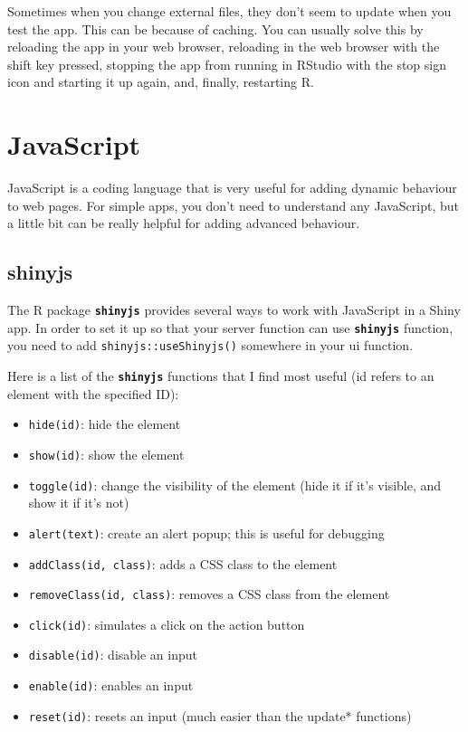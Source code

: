 \documentclass[
  oneside]{book}
\newcommand{\AttributeTok}[1]{\textcolor[rgb]{0.77,0.63,0.00}{#1}}
\providecommand{\tightlist}{%
  \setlength{\itemsep}{0pt}\setlength{\parskip}{0pt}}
\begin{document}
\begin{warning}
Sometimes when you change external files, they don't seem to update when you test the app. This can be because of caching. You can usually solve this by reloading the app in your web browser, reloading in the web browser with the shift key pressed, stopping the app from running in RStudio with the stop sign icon and starting it up again, and, finally, restarting R.

\end{warning}

\hypertarget{JavaScript}{%
\section{JavaScript}\label{JavaScript}}

JavaScript is a coding language that is very useful for adding dynamic behaviour to web pages. For simple apps, you don't need to understand any JavaScript, but a little bit can be really helpful for adding advanced behaviour.

\hypertarget{shinyjs}{%
\subsection{shinyjs}\label{shinyjs}}

The R package \textbf{\texttt{shinyjs}} provides several ways to work with JavaScript in a Shiny app. In order to set it up so that your server function can use \textbf{\texttt{shinyjs}} function, you need to add \texttt{shinyjs::useShinyjs}\texttt{()} somewhere in your ui function.

Here is a list of the \textbf{\texttt{shinyjs}} functions that I find most useful (\AttributeTok{id} refers to an element with the specified ID):

\begin{itemize}
\tightlist
\item
  \texttt{hide}\texttt{(id)}: hide the element
\item
  \texttt{show}\texttt{(id)}: show the element
\item
  \texttt{toggle}\texttt{(id)}: change the visibility of the element (hide it if it's visible, and show it if it's not)
\item
  \texttt{alert}\texttt{(text)}: create an alert popup; this is useful for debugging
\item
  \texttt{addClass}\texttt{(id,\ class)}: adds a CSS class to the element
\item
  \texttt{removeClass}\texttt{(id,\ class)}: removes a CSS class from the element
\item
  \texttt{click}\texttt{(id)}: simulates a click on the action button
\item
  \texttt{disable}\texttt{(id)}: disable an input
\item
  \texttt{enable}\texttt{(id)}: enables an input
\item
  \texttt{reset}\texttt{(id)}: resets an input (much easier than the update* functions)
\end{itemize}
\end{document}
